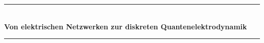 \documentclass[11pt,a4paper,leqno]{report}
\numberwithin{equation}{chapter}
\renewcommand{\contentsname}{Inhaltsverzeichnis}
\begin{document}
\begin{titlepage}

\vspace*{5cm}
\begin{center}
\rule{\linewidth}{0.5mm} \\[0.4cm]
{ \Huge \bfseries Von elektrischen Netzwerken zur diskreten Quantenelektrodynamik} \\[0.2cm]
\rule{\linewidth}{0.5mm} \\[3.5cm]
\begin{minipage}[t]{0.4\textwidth}
%


\end{minipage}
\begin{minipage}[t]{0.4\textwidth}

\end{minipage}
 

 
\end{center}
 
\end{titlepage}




\tableofcontents


\vfill
\end{document}
